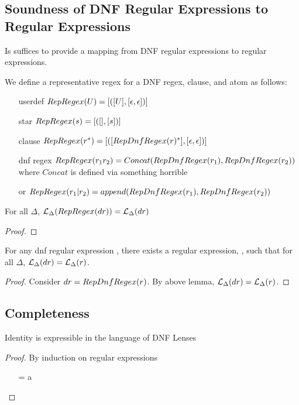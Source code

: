 \subsection{Soundness of DNF Regular Expressions to Regular Expressions}
Is suffices to provide a mapping from DNF regular expressions to regular
expressions.
\begin{definition}[RepRegex]
We define a representative regex for a DNF regex, clause, and atom as follows:
\begin{itemize}
\item[userdef] $RepRegex(U)=[([U],[\epsilon,\epsilon])]$
\item[star] $RepRegex(s)=[([],[s])]$
\item[clause] $RepRegex(r^*) = [([RepDnfRegex(r)^*],[\epsilon,\epsilon])]$
\item[dnf regex] $RepRegex(r_1r_2) = Concat(RepDnfRegex(r_1),RepDnfRegex(r_2))$ where $Concat$ is defined via something horrible
\item[or] $RepRegex(r_1|r_2) = append(RepDnfRegex(r_1),RepDnfRegex(r_2))$
\end{itemize}
\end{definition}

\begin{lemma}
For all $\Delta$, $\mathcal{L}_{\Delta}(RepRegex(dr)) = \mathcal{L}_{\Delta}(dr)$
\begin{proof}
\end{proof}
\end{lemma}

\begin{theorem}
For any dnf regular expression \DNFRegex{}, there exists a regular expression, \DNFRegex{},
such that for all $\Delta$, $\mathcal{L}_{\Delta}(dr) = \mathcal{L}_{\Delta}(r)$.
\begin{proof}
Consider $dr=RepDnfRegex(r)$.  By above lemma, $\mathcal{L}_{\Delta}(dr)=\mathcal{L}_{\Delta}(r)$.
\end{proof}
\end{theorem}

\subsection{Completeness}
\begin{lemma}
Identity is expressible in the language of DNF Lenses
\begin{proof}
By induction on regular expressions
\begin{enumerate}
\item[\Regex=\UserDefined] a
\end{enumerate}
\end{proof}
\end{lemma}

